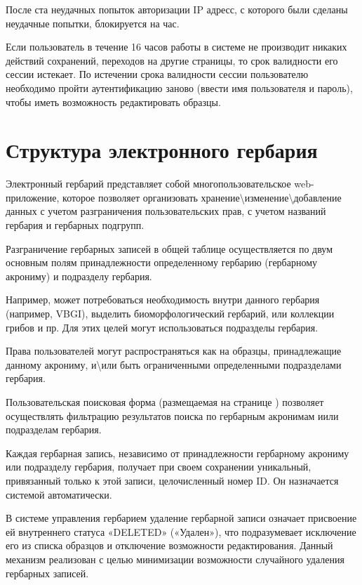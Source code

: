 \documentclass[letterpaper,10pt,russian]{sphinxmanual}
\begin{document}
После ста неудачных попыток авторизации IP адресс, с которого были сделаны неудачные попытки,
блокируется на час.

Если пользователь в течение 16 часов работы в системе не производит никаких действий \textendash{} сохранений,
переходов на другие страницы, то срок валидности его сессии истекает.
По истечении срока валидности сессии пользователю необходимо пройти аутентификацию заново
(ввести имя пользователя и пароль), чтобы иметь возможность редактировать образцы.

\ignorespaces 

\section{Структура электронного гербария}
\label{\detokenize{main:id5}}\label{\detokenize{main:index-1}}
Электронный гербарий представляет собой многопользовательское web-приложение, которое позволяет
организовать хранение\textbackslash{}изменение\textbackslash{}добавление данных с учетом разграничения пользовательских прав,
с учетом названий гербария и гербарных подгрупп.

Разграничение гербарных записей в общей таблице осуществляется по двум основным полям \textendash{}
принадлежности определенному гербарию (гербарному акрониму) и подразделу гербария.

Например, может потребоваться необходимость внутри данного гербария (например, VBGI),
выделить биоморфологический гербарий, или коллекции грибов и пр. Для этих целей могут
использоваться подразделы гербария.

Права пользователей могут распространяться как на образцы, принадлежащие данному акрониму,
и\textbackslash{}или быть ограниченными определенными подразделами гербария.

Пользовательская поисковая форма (размещаемая на странице )
позволяет осуществлять фильтрацию результатов поиска по гербарным акронимам иили подразделам гербария.

Каждая гербарная запись, независимо от принадлежности гербарному акрониму
или подразделу гербария, получает при своем сохранении уникальный,
привязанный только к этой записи, целочисленный номер ID.
Он назначается системой автоматически.

В системе управления гербарием удаление гербарной записи означает присвоение ей внутреннего статуса
«DELETED» («Удален»), что подразумевает исключение его из списка образцов и
отключение возможности редактирования. Данный механизм реализован с целью
минимизации возможности случайного удаления гербарных записей.
\end{document}
